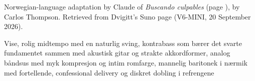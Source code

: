 
\label{sec:aa-finne-noen-andre-aa-bebreide}
\begin{notes}
Norwegian-language adaptation by Claude of \emph{Buscando culpables} (page \pageref{sec:buscando-culpables}), by Carlos Thompson. Retrieved from Dvigitt's Suno page (V6-MINI, 20 September 2026).
\end{notes}
\begin{style}
Vise, rolig midtempo med en naturlig sving, kontrabass som bærer det svarte fundamentet sammen med akustisk gitar og strakte akkordformer, analog båndsus med myk kompresjon og intim romfarge, mannelig baritonek i nærmik med fortellende, confessional delivery og diskret dobling i refrengene
\end{style}
